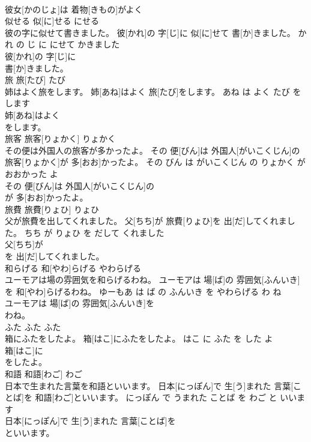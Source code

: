 \documentclass[8pt]{extreport}
\begin{document}
\begin{CJK}{UTF8}{min}
\\	彼女[かのじょ]は 着物[きもの]がよく
\\	似せる	似[に]せる	にせる	
\\	彼の字に似せて書きました。	彼[かれ]の 字[じ]に 似[に]せて 書[か]きました。	かれ の じ に にせて かきました	
\\	彼[かれ]の 字[じ]に
\\	書[か]きました。			
\\	旅	旅[たび]	たび	
\\	姉はよく旅をします。	姉[あね]はよく 旅[たび]をします。	あね は よく たび を します	
\\	姉[あね]はよく
\\	をします。			
\\	旅客	旅客[りょかく]	りょかく	
\\	その便は外国人の旅客が多かったよ。	その 便[びん]は 外国人[がいこくじん]の 旅客[りょかく]が 多[おお]かったよ。	その びん は がいこくじん の りょかく が おおかった よ	
\\	その 便[びん]は 外国人[がいこくじん]の
\\	が 多[おお]かったよ。			
\\	旅費	旅費[りょひ]	りょひ	
\\	父が旅費を出してくれました。	父[ちち]が 旅費[りょひ]を 出[だ]してくれました。	ちち が りょひ を だして くれました	
\\	父[ちち]が
\\	を 出[だ]してくれました。			
\\	和らげる	和[やわ]らげる	やわらげる	
\\	ユーモアは場の雰囲気を和らげるわね。	ユーモアは 場[ば]の 雰囲気[ふんいき]を 和[やわ]らげるわね。	ゆーもあ は ば の ふんいき を やわらげる わ ね	
\\	ユーモアは 場[ば]の 雰囲気[ふんいき]を
\\	わね。			
\\	ふた	ふた	ふた	
\\	箱にふたをしたよ。	箱[はこ]にふたをしたよ。	はこ に ふた を した よ	
\\	箱[はこ]に
\\	をしたよ。			
\\	和語	和語[わご]	わご	
\\	日本で生まれた言葉を和語といいます。	日本[にっぽん]で 生[う]まれた 言葉[ことば]を 和語[わご]といいます。	にっぽん で うまれた ことば を わご と いいます	
\\	日本[にっぽん]で 生[う]まれた 言葉[ことば]を
\\	といいます。			

\end{CJK}
\end{document}

